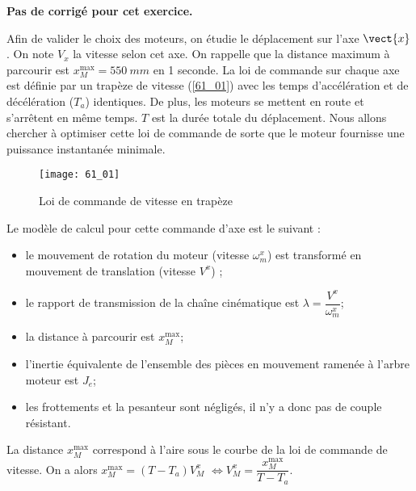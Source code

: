 \normaltrue
\correctionfalse


\setcounter{question}{0}
\ifcorrection
\else
\textbf{Pas de corrigé pour cet exercice.}
\fi

\ifprof
\else
Afin de valider le choix des moteurs, on étudie le déplacement sur l’axe $\vect{x}$.%
On note $V_x$ la vitesse selon cet axe.
On rappelle que la distance maximum à parcourir est $x_M^{\text{max}} = \SI{550}{mm}$ en 1 seconde.
La loi de commande sur chaque axe est définie par un trapèze de vitesse (\autoref{61_01})
avec les temps d’accélération et de décélération ($T_a$) identiques. De plus, les moteurs se mettent en route et s’arrêtent en
même temps. $T$ est la durée totale du déplacement. Nous allons chercher à optimiser cette loi de commande de sorte
que le moteur fournisse une puissance instantanée minimale.

\begin{figure}[H]
\centering
\texttt{[image: 61\_01]}
\caption{\label{61_01} Loi de commande de vitesse en trapèze}
\end{figure}

Le modèle de calcul pour cette commande d’axe est le suivant :
\begin{itemize}
\item le mouvement de rotation du moteur (vitesse $\omega_m^x$) est transformé en mouvement de translation (vitesse $V^x$) ;
\item le rapport de transmission de la chaîne cinématique est $\lambda = \dfrac{V^x}{\omega_m^x}$;
\item la distance à parcourir est $x_M^{\text{max}}$;
\item l’inertie équivalente de l’ensemble des pièces en mouvement ramenée à l’arbre moteur est $J_e$;
\item les frottements et la pesanteur sont négligés, il n’y a donc pas de couple résistant.
\end{itemize}
\fi
{}
\ifprof
La distance  $x_M^{\text{max}}$ correspond à l'aire sous le courbe de la loi de commande de vitesse.
On a alors 
 $x_M^{\text{max}} = \left(T-T_a\right)V_M^x$ 
 $ \Longleftrightarrow V_M^x=\dfrac{x_M^{\text{max}}}{T-T_a}$. 
\else
\fi

